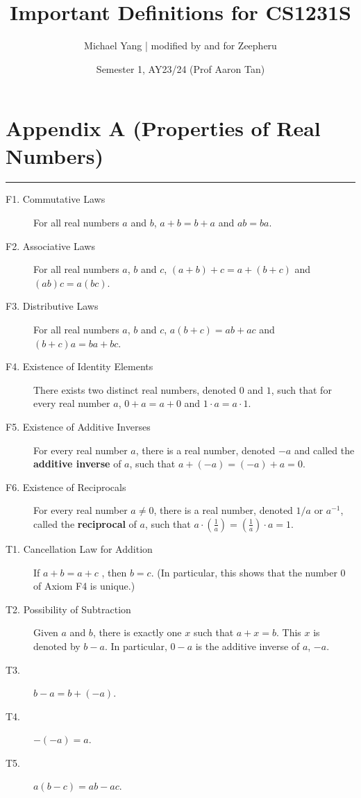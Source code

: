 \documentclass{article}
\title{Important Definitions for CS1231S}
\author{Michael Yang | modified by and for Zeepheru}
\date{Semester 1, AY23/24 (Prof Aaron Tan)}
\begin{document}
\maketitle
\newpage


\section*{Appendix A (Properties of Real Numbers)}
\hrule
\begin{multicols*}{2}
    \begin{description}
        \item[F1. Commutative Laws]For all real numbers $a$ and $b$, $a + b = b + a$ and $ab = ba$.
        \item[F2. Associative Laws]For all real numbers $a$, $b$ and $c$, $(a+b) + c = a + (b + c)$ and $(ab)c = a(bc)$.
        \item[F3. Distributive Laws]For all real numbers $a$, $b$ and $c$, $a(b + c) = ab + ac$ and $(b+c)a = ba + bc$.
        \item[F4. Existence of Identity Elements]There exists two distinct real numbers, denoted $0$ and $1$, such that for every real number $a$, $0 + a = a + 0$ and $1 \cdot a = a \cdot 1$.
        \item[F5. Existence of Additive Inverses]For every real number $a$, there is a real number, denoted $-a$ and called the \textbf{additive inverse} of $a$, such that $a + (-a) = (-a) + a = 0$.
        \item[F6. Existence of Reciprocals]For every real number $a\neq0$, there is a real number, denoted $1/a$ or $a^{-1}$, called the \textbf{reciprocal} of $a$, such that $a \cdot (\frac{1}{a}) = (\frac{1}{a})\cdot a = 1$.
        \item[T1. Cancellation Law for Addition]If $a + b = a + c$ , then $b = c$. (In particular, this shows that the number 0 of Axiom F4 is unique.)
        \item[T2. Possibility of Subtraction]Given $a$ and $b$, there is exactly one $x$ such that $a+x=b$. This $x$ is denoted by $b-a$. In particular, $0-a$ is the additive inverse of $a$, $-a$.
        \item[T3.]$b-a=b+(-a)$.
        \item[T4.]$-(-a)=a$.
        \item[T5.]$a(b-c)=ab-ac$.

\end{description}
\end{multicols*}
\end{document}
